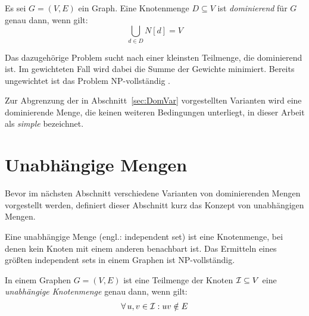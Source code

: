 
\begin{mydef}
    Es sei $G=(V,E)$ ein Graph. Eine Knotenmenge $D \subseteq V$ ist \emph{dominierend} für $G$ genau dann, wenn gilt:
    \[ \bigcup_{d \in D}N[d] = V \]
\end{mydef}


Das dazugehörige Problem sucht nach einer kleinsten Teilmenge, die dominierend ist. Im gewichteten Fall wird dabei die Summe der Gewichte minimiert. Bereits ungewichtet ist das Problem NP-vollständig \cite{garey1979computers}.

Zur Abgrenzung der in Abschnitt~\ref{sec:DomVar} vorgestellten Varianten wird eine dominierende Menge, die keinen weiteren Bedingungen unterliegt, in dieser Arbeit als \emph{simple} bezeichnet.

%

\section{Unabhängige Mengen}
Bevor im nächsten Abschnitt verschiedene Varianten von dominierenden Mengen vorgestellt werden, definiert dieser Abschnitt kurz das Konzept von unabhängigen Mengen.

Eine unabhängige Menge (engl.: independent set) ist eine Knotenmenge, bei denen kein Knoten mit einem anderen benachbart ist. Das Ermitteln eines größten independent sets in einem Graphen ist NP-vollständig.

\begin{mydef}
    In einem Graphen $G=(V,E)$ ist eine Teilmenge der Knoten $\mathcal{I} \subseteq V$ eine \emph{unabhängige Knotenmenge} genau dann, wenn gilt: \[ \forall\, u,v \in \mathcal{I}: uv \notin E \]
\end{mydef}


